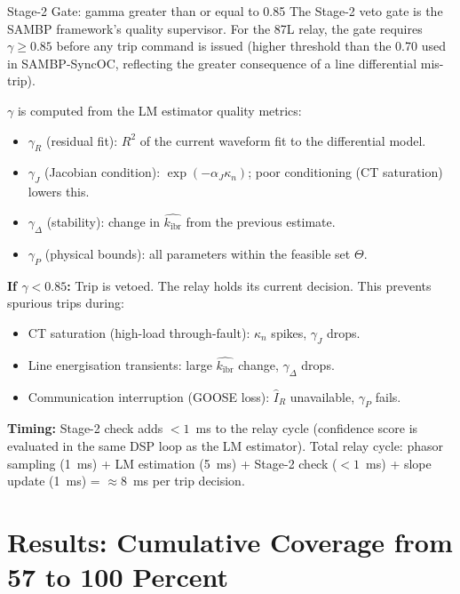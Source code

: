 \documentclass[12pt,a4paper]{article}
\newcommand{\kibr}{k_\mathrm{ibr}}
\begin{document}
\begin{archbox}{Stage-2 Gate: gamma greater than or equal to 0.85}
The Stage-2 veto gate is the SAMBP framework's quality supervisor. For the 87L relay, the gate requires $\gamma \geq 0.85$ before any trip command is issued (higher threshold than the 0.70 used in SAMBP-SyncOC, reflecting the greater consequence of a line differential mis-trip).

$\gamma$ is computed from the LM estimator quality metrics:
\begin{itemize}[nosep]
  \item \textbf{$\gamma_R$} (residual fit): $R^2$ of the current waveform fit to the differential model.
  \item \textbf{$\gamma_J$} (Jacobian condition): $\exp(-\alpha_J \kappa_n)$; poor conditioning (CT saturation) lowers this.
  \item \textbf{$\gamma_\Delta$} (stability): change in $\hat{\kibr}$ from the previous estimate.
  \item \textbf{$\gamma_P$} (physical bounds): all parameters within the feasible set $\Theta$.
\end{itemize}

\textbf{If $\gamma < 0.85$:} Trip is vetoed. The relay holds its current decision. This prevents spurious trips during:
\begin{itemize}[nosep]
  \item CT saturation (high-load through-fault): $\kappa_n$ spikes, $\gamma_J$ drops.
  \item Line energisation transients: large $\hat{\kibr}$ change, $\gamma_\Delta$ drops.
  \item Communication interruption (GOOSE loss): $\hat{I}_R$ unavailable, $\gamma_P$ fails.
\end{itemize}

\textbf{Timing:} Stage-2 check adds $< 1$~ms to the relay cycle (confidence score is evaluated in the same DSP loop as the LM estimator). Total relay cycle: phasor sampling (1~ms) + LM estimation (5~ms) + Stage-2 check ($< 1$~ms) + slope update (1~ms) = $\approx 8$~ms per trip decision.
\end{archbox}

\section{Results: Cumulative Coverage from 57 to 100 Percent}
\end{document}
